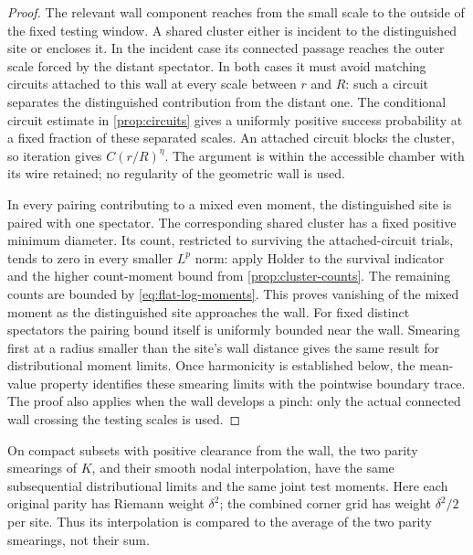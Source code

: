 \begin{proof}
The relevant wall component reaches from the small scale to the outside of
the fixed testing window. A shared cluster either is incident to the
distinguished site or encloses it. In the incident case its connected
passage reaches the outer scale forced by the distant spectator. In both cases it must
avoid matching circuits attached to this wall at every scale between
$r$ and $R$: such a circuit separates the distinguished contribution
from the distant one. The conditional circuit estimate in \cref{prop:circuits}
gives a uniformly positive success probability at a fixed fraction of these
separated scales. An attached circuit blocks the cluster, so iteration gives
$C(r/R)^\eta$. The argument is within the accessible chamber with its wire
retained; no regularity of the geometric wall is used.

In every pairing contributing to a mixed even moment, the distinguished
site is paired with one spectator. The corresponding shared cluster has
a fixed positive minimum diameter. Its count, restricted to surviving the
attached-circuit trials, tends to zero in every smaller $L^p$ norm: apply
Holder to the survival indicator and the higher count-moment bound from
\cref{prop:cluster-counts}. The remaining counts are bounded by
\cref{eq:flat-log-moments}. This proves vanishing of the mixed moment as
the distinguished site approaches the wall. For fixed distinct spectators
the pairing bound itself is uniformly bounded near the wall. Smearing first
at a radius smaller than the site's wall distance gives the same result
for distributional moment limits. Once harmonicity is established below,
the mean-value property identifies these smearing limits with the pointwise
boundary trace. The proof also applies when the wall develops a pinch:
only the actual connected wall crossing the testing scales is used.
\end{proof}

\begin{lemma}
\label{lem:parity-interpolation}
On compact subsets with positive clearance from the wall, the two parity
smearings of $K$, and their smooth nodal interpolation, have the same
subsequential distributional limits and the same joint test moments.
Here each original parity has Riemann weight $\delta^2$; the combined
corner grid has weight $\delta^2/2$ per site. Thus its interpolation is
compared to the average of the two parity smearings, not their sum.
\end{lemma}

